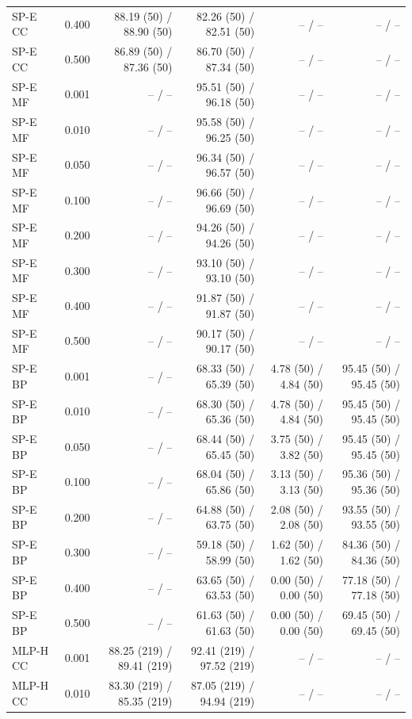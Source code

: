 \begin{longtable}{lrrrrr}
SP-E CC & 0.400 & 88.19 (50) / 88.90 (50) & 82.26 (50) / 82.51 (50) & -- / -- & -- / -- \\
SP-E CC & 0.500 & 86.89 (50) / 87.36 (50) & 86.70 (50) / 87.34 (50) & -- / -- & -- / -- \\
SP-E MF & 0.001 & -- / -- & 95.51 (50) / 96.18 (50) & -- / -- & -- / -- \\
SP-E MF & 0.010 & -- / -- & 95.58 (50) / 96.25 (50) & -- / -- & -- / -- \\
SP-E MF & 0.050 & -- / -- & 96.34 (50) / 96.57 (50) & -- / -- & -- / -- \\
SP-E MF & 0.100 & -- / -- & 96.66 (50) / 96.69 (50) & -- / -- & -- / -- \\
SP-E MF & 0.200 & -- / -- & 94.26 (50) / 94.26 (50) & -- / -- & -- / -- \\
SP-E MF & 0.300 & -- / -- & 93.10 (50) / 93.10 (50) & -- / -- & -- / -- \\
SP-E MF & 0.400 & -- / -- & 91.87 (50) / 91.87 (50) & -- / -- & -- / -- \\
SP-E MF & 0.500 & -- / -- & 90.17 (50) / 90.17 (50) & -- / -- & -- / -- \\
SP-E BP & 0.001 & -- / -- & 68.33 (50) / 65.39 (50) & 4.78 (50) / 4.84 (50) & 95.45 (50) / 95.45 (50) \\
SP-E BP & 0.010 & -- / -- & 68.30 (50) / 65.36 (50) & 4.78 (50) / 4.84 (50) & 95.45 (50) / 95.45 (50) \\
SP-E BP & 0.050 & -- / -- & 68.44 (50) / 65.45 (50) & 3.75 (50) / 3.82 (50) & 95.45 (50) / 95.45 (50) \\
SP-E BP & 0.100 & -- / -- & 68.04 (50) / 65.86 (50) & 3.13 (50) / 3.13 (50) & 95.36 (50) / 95.36 (50) \\
SP-E BP & 0.200 & -- / -- & 64.88 (50) / 63.75 (50) & 2.08 (50) / 2.08 (50) & 93.55 (50) / 93.55 (50) \\
SP-E BP & 0.300 & -- / -- & 59.18 (50) / 58.99 (50) & 1.62 (50) / 1.62 (50) & 84.36 (50) / 84.36 (50) \\
SP-E BP & 0.400 & -- / -- & 63.65 (50) / 63.53 (50) & 0.00 (50) / 0.00 (50) & 77.18 (50) / 77.18 (50) \\
SP-E BP & 0.500 & -- / -- & 61.63 (50) / 61.63 (50) & 0.00 (50) / 0.00 (50) & 69.45 (50) / 69.45 (50) \\
MLP-H CC & 0.001 & 88.25 (219) / 89.41 (219) & 92.41 (219) / 97.52 (219) & -- / -- & -- / -- \\
MLP-H CC & 0.010 & 83.30 (219) / 85.35 (219) & 87.05 (219) / 94.94 (219) & -- / -- & -- / -- \\

\end{longtable}

